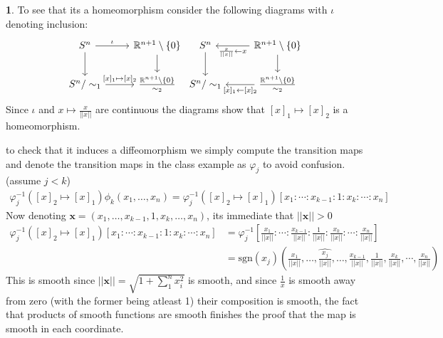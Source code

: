 \documentclass[10.5pt]{article}
\theoremstyle{definition}
\newtheorem{pb}{}
\newcommand{\set}[1]{\{#1\}}
\newcommand{\norm}[1]{\lvert\lvert#1\rvert\rvert}
\begin{document}
\begin{pb}
        To see that its a homeomorphism consider the following diagrams with \(\iota\) denoting inclusion:
        \begin{equation*}
            \begin{tikzcd}
                S^n \arrow[r,"{\iota}"] \arrow[d,"{}"] &\mathbb{R}^{n+1}\setminus\set{0} \arrow[d,"{}"] \\
                S^n/\sim_1 \arrow[r,"{[x]_1\mapsto [x]_2} "] & \frac{\mathbb{R}^{n+1}\setminus\set{0}}{\sim_2}
            \end{tikzcd}
            \begin{tikzcd}
                S^n  \arrow[d,"{}"] &\mathbb{R}^{n+1}\setminus\set{0} \arrow[d,"{}"]\arrow[l,"{\frac{x}{\norm{x}} \leftarrow x}"] \\
                S^n/\sim_1  & \frac{\mathbb{R}^{n+1}\setminus\set{0}}{\sim_2} \arrow[l,"{[x]_1\leftarrow [x]_2} "]
            \end{tikzcd}
        \end{equation*}
        Since \(\iota\) and \(x \mapsto \frac{x}{\norm{x}}\) are continuous the diagrams show that \([x]_1 \mapsto [x]_2\) is a homeomorphism.
        
        to check that it induces a diffeomorphism we simply compute the transition maps and denote the transition maps in the class example as \(\varphi_j\) to avoid confusion. (assume \(j < k\))
        \begin{align*}
            \varphi_j^{-1}([x]_2 \mapsto [x]_1)\phi_k(x_1,\hdots,x_n) = \varphi_j^{-1}([x]_2 \mapsto [x]_1)[x_1:\cdots:x_{k-1}:1:x_k:\cdots:x_n]
        \end{align*}
        Now denoting \(\mathbf{x} = (x_1,\hdots,x_{k-1},1,x_k,\hdots,x_n)\), its immediate that \(\norm{\mathbf{x}} > 0\)
        \begin{align*}
            \varphi_j^{-1}([x]_2 \mapsto [x]_1)[x_1:\cdots:x_{k-1}:1:x_k:\cdots:x_n] &= \varphi_j^{-1}\left[\frac{x_1}{\norm{x}}:\cdots:\frac{x_{k-1}}{\norm{x}}:\frac{1}{\norm{x}}:\frac{x_k}{\norm{x}}:\cdots:\frac{x_n}{\norm{x}}\right] \\
            &= \text{sgn}(x_j)\left(\frac{x_1}{\norm{x}},\hdots,\widehat{\frac{x_j}{\norm{x}}},\hdots,\frac{x_{k-1}}{\norm{x}},\frac{1}{\norm{x}},\frac{x_k}{\norm{x}},\cdots,\frac{x_n}{\norm{x}}\right)
        \end{align*}
        This is smooth since \(\norm{\mathbf{x}} = \sqrt{1 + \sum_1^n x_i^2}\) is smooth, and since \(\frac{1}{x}\) is smooth away from zero (with the former being atleast 1) their composition is smooth, the fact that products of smooth functions are smooth finishes the proof that the map is smooth in each coordinate.


\end{pb}
\end{document}

